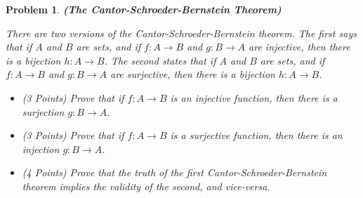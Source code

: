 \documentclass{article}
\theoremstyle{normal}
\newtheorem{problem}{Problem}
\begin{document}
    \begin{problem}
        \textbf{(The Cantor-Schroeder-Bernstein Theorem)}
        \par\hfill\par
        There are two versions of the Cantor-Schroeder-Bernstein theorem. The
        first says that if $A$ and $B$ are sets, and if $f:A\rightarrow{B}$ and
        $g:B\rightarrow{A}$ are injective, then there is a bijection
        $h:A\rightarrow{B}$. The second states that if
        $A$ and $B$ are sets, and if $f:A\rightarrow{B}$ and $g:B\rightarrow{A}$
        are surjective, then there is a bijection $h:A\rightarrow{B}$.
        \begin{itemize}
            \item (3 Points) Prove that if $f:A\rightarrow{B}$ is an injective
                function, then there is a surjection $g:B\rightarrow{A}$.
            \item (3 Points) Prove that if $f:A\rightarrow{B}$ is a surjective
                function, then there is an injection $g:B\rightarrow{A}$.
            \item (4 Points) Prove that the truth of the first
                Cantor-Schroeder-Bernstein theorem implies the validity of the
                second, and vice-versa.
        \end{itemize}
    \end{problem}
\end{document}
